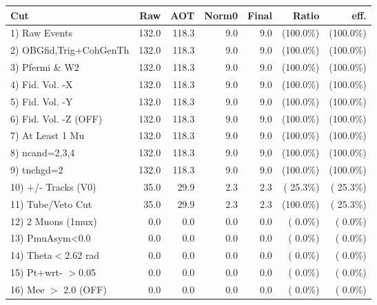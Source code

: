  \begin{table}[h!]\centering
 \begin{tabular}{||l||r|r|r|r|r|r||}
 \hline
 \hline
 Cut & Raw & AOT & Norm0 & Final & Ratio & eff.       \\
 \hline
  1) Raw Events           &        132.0 &        118.3 &          9.0 &          9.0 & (100.0\%) & (100.0\%) \\
  2) OBGfid,Trig+CohGenTh &        132.0 &        118.3 &          9.0 &          9.0 & (100.0\%) & (100.0\%) \\
  3) Pfermi \& W2         &        132.0 &        118.3 &          9.0 &          9.0 & (100.0\%) & (100.0\%) \\
  4) Fid. Vol. -X         &        132.0 &        118.3 &          9.0 &          9.0 & (100.0\%) & (100.0\%) \\
  5) Fid. Vol. -Y         &        132.0 &        118.3 &          9.0 &          9.0 & (100.0\%) & (100.0\%) \\
  6) Fid. Vol. -Z (OFF)   &        132.0 &        118.3 &          9.0 &          9.0 & (100.0\%) & (100.0\%) \\
  7) At Least 1 Mu        &        132.0 &        118.3 &          9.0 &          9.0 & (100.0\%) & (100.0\%) \\
  8) ncand=2,3,4          &        132.0 &        118.3 &          9.0 &          9.0 & (100.0\%) & (100.0\%) \\
  9) tnchgd=2             &        132.0 &        118.3 &          9.0 &          9.0 & (100.0\%) & (100.0\%) \\
 10) +/- Tracks (V0)      &         35.0 &         29.9 &          2.3 &          2.3 & ( 25.3\%) & ( 25.3\%) \\
 11) Tube/Veto Cut        &         35.0 &         29.9 &          2.3 &          2.3 & (100.0\%) & ( 25.3\%) \\
 12) 2 Muons (1mux)       &          0.0 &          0.0 &          0.0 &          0.0 & (  0.0\%) & (  0.0\%) \\
 13) PmuAsym<0.0          &          0.0 &          0.0 &          0.0 &          0.0 & (  0.0\%) & (  0.0\%) \\
 14) Theta$<$2.62 rad     &          0.0 &          0.0 &          0.0 &          0.0 & (  0.0\%) & (  0.0\%) \\
 15) Pt+wrt- $>$0.05      &          0.0 &          0.0 &          0.0 &          0.0 & (  0.0\%) & (  0.0\%) \\
 16) Mee $>$ 2.0  (OFF)   &          0.0 &          0.0 &          0.0 &          0.0 & (  0.0\%) & (  0.0\%) \\

\end{tabular}
\end{table}
